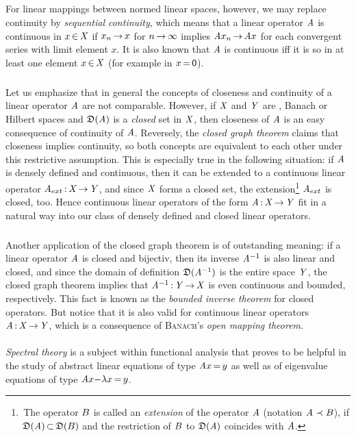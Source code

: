 \documentclass[11pt,twoside]{article}
\begin{document}
\subparagraph{} %
For linear mappings between normed linear spaces,
however,
we may replace continuity by \textit{sequential continuity},
which means that a linear operator $\mathit{A}$ is continuous in $x {\,\in\,} \mathit{X}$
if $x_n {\,\to\,} x$ for $n {\,\to\,} \infty$ implies $\mathit{A} x_n {\,\to\,} \mathit{A} x$
for each convergent series with limit element $x$.
It is also known that $\mathit{A}$ is continuous iff
it is so in at least one element $x {\,\in\,} \mathit{X}$
(for example in $x {\,=\,} {\mathsf{0}}$).

\subparagraph{} %
Let us emphasize that in general 
the concepts of closeness and continuity of a linear operator $\mathit{A}$
are not comparable.
However,
if $\mathit{X}$ and $\mathit{Y}$ are {\FRECHET}, Banach or Hilbert spaces
and $\mathfrak{D}(\mathit{A})$ is a \textit{closed} set in $\mathit{X}$,
then closeness of $\mathit{A}$ is an easy consequence of continuity of $\mathit{A}$.
Reversely,
the \textit{closed graph theorem} claims that closeness implies continuity,
so both concepts are equivalent to each other
under this restrictive assumption.
This is especially true in the following situation:
if $\mathit{A}$ is densely defined and continuous,
then it can be extended to a continuous linear operator
$\mathit{A}_{ext} {\,:\,} \mathit{X} {\,\to\,} \mathit{Y}$,
and since $\mathit{X}$ forms a closed set,
the extension\footnote{
\,The operator ${B}$ is called an \textit{extension} of the operator $\mathit{A}$
(notation $\mathit{A} \prec {B}$),
if $\mathfrak{D}(\mathit{A}) {\,\subset\,} \mathfrak{D}({B})$ and the restriction of ${B}$
to $\mathfrak{D}(\mathit{A})$ coincides with $\mathit{A}$.}
$\mathit{A}_{ext}$ is closed,
too.
Hence continuous linear operators of the form $\mathit{A} {\,:\,} \mathit{X} {\,\to\,} \mathit{Y}$
fit in a natural way
into our class of densely defined and closed linear operators.

\subparagraph{} %
Another application of the closed graph theorem is of outstanding meaning:
if a linear operator $\mathit{A}$ is closed and bijectiv,
then its inverse $\mathit{A}^{-1}$ is also linear and closed,
and since the domain of definition $\mathfrak{D}(\mathit{A}^{-1})$
is the entire space $\mathit{Y}$,
the closed graph theorem implies that $\mathit{A}^{-1} {\,:\,} \mathit{Y} {\,\to\,} \mathit{X}$
is even continuous and bounded,
respectively.
This fact is known as the \textit{bounded inverse theorem} for closed operators.
But notice that it is also valid for continuous linear operators
$\mathit{A} {\,:\,} \mathit{X} {\,\to\,} \mathit{Y}$,
which is a consequence of \textsc{Banach}'s \textit{open mapping theorem}.

\paragraph{} %
\textit{Spectral theory} is a subject within functional analysis
that proves to be helpful in the study of abstract linear equations
of type $\mathit{A} x {\,=\,} y$
as well as of eigen\-value equations of type $\mathit{A} x {-} \lambda x {\,=\,} y$.
\end{document}
